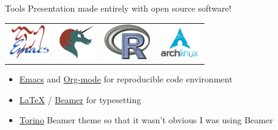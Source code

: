 \documentclass[sans,aspectratio=169,presentation,bigger,fleqn]{beamer}
\begin{document}
\begin{frame}[label=sec-36]{Tools}
Presentation made entirely with open source software!

\begin{center}
\begin{center}
\begin{tabular}{llll}
\includegraphics[height=1.5cm]{./img/emacs.png} & \includegraphics[height=1.5cm]{./img/org-mode.png} & \includegraphics[height=1.5cm]{./img/r.png} & \includegraphics[height=1.5cm]{./img/arch.png}\\
\end{tabular}
\end{center}
\end{center}

\begin{itemize}
\item \href{http://www.gnu.org/software/emacs/}{Emacs} and \href{http://orgmode.org/}{Org-mode} for reproducible code environment
\item \href{http://www.latex-project.org/}{\LaTeX} / \href{http://www.ctan.org/tex-archive/macros/latex/contrib/beamer/}{Beamer} for typesetting
\item \href{http://blog.barisione.org/2007-09/torino-a-pretty-theme-for-latex-beamer/}{Torino} Beamer theme so that it wasn't obvious I was using Beamer
\end{itemize}
\end{frame}
\end{document}
